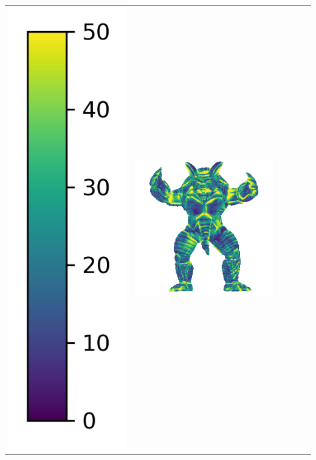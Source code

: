 \begin{tabularx}{\linewidth}{@{}Y@{}Y@{}Y@{}Y@{}Y@{}Y@{}}
\includegraphics[width=0.2\linewidth]{semisynthetic/colorbar_error_vertical.png} &
\includegraphics[width=\linewidth]{semisynthetic/20150514_22_ours_err.png} &

\end{tabularx}
